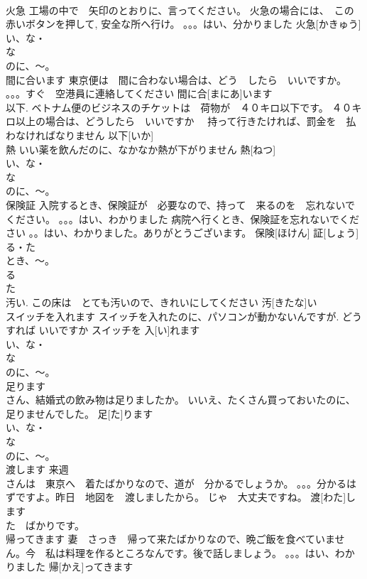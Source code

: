 \documentclass[8pt]{extreport}
\begin{document}
\begin{CJK}{UTF8}{min}
\\	火急	工場の中で　矢印のとおりに、言ってください。 火急の場合には、　この赤いボタンを押して, 安全な所へ行け。 。。。はい、分かりました	火急[かきゅう]				
\\	い、な・
\\	な
\\	のに、～。
\\	間に合います	東京便は　間に合わない場合は、どう　したら　いいですか。 。。。すぐ　空港員に連絡してください	間に合[まにあ]います					
\\	以下.	ベトナム便のビジネスのチケットは　荷物が　４０キロ以下です。 ４０キロ以上の場合は、どうしたら　いいですか　 持って行きたければ、罰金を　払わなければなりません	以下[いか]					
\\	熱	いい薬を飲んだのに、なかなか熱が下がりません	熱[ねつ]				
\\	い、な・
\\	な
\\	のに、～。
\\	保険証	入院するとき、保険証が　必要なので、持って　来るのを　忘れないで　ください。 。。。はい、わかりました 病院へ行くとき、保険証を忘れないでください 。。はい、わかりました。ありがとうございます。	保険[ほけん] 証[しょう]				
\\	る・た
\\	とき、～。
\\	る 
\\	た
\\	汚い.	この床は　とても汚いので、きれいにしてください	汚[きたな]い					
\\	スイッチを入れます	スイッチを入れたのに、パソコンが動かないんですが. どうすれば いいですか	スイッチを 入[い]れます				
\\	い、な・
\\	な
\\	のに、～。
\\	足ります	
\\	さん、結婚式の飲み物は足りましたか。 いいえ、たくさん買っておいたのに、足りませんでした。	足[た]ります				
\\	い、な・
\\	な
\\	のに、～。
\\	渡します	来週　
\\	さんは　東京へ　着たばかりなので、道が　分かるでしょうか。 。。。分かるはずですよ。昨日　地図を　渡しましたから。 じゃ　大丈夫ですね。	渡[わた]します				
\\	た　ばかりです。
\\	帰ってきます	妻　さっき　帰って来たばかりなので、晩ご飯を食べていません。今　私は料理を作るところなんです。後で話しましょう。 。。。はい、わかりました	帰[かえ]ってきます				

\end{CJK}
\end{document}
